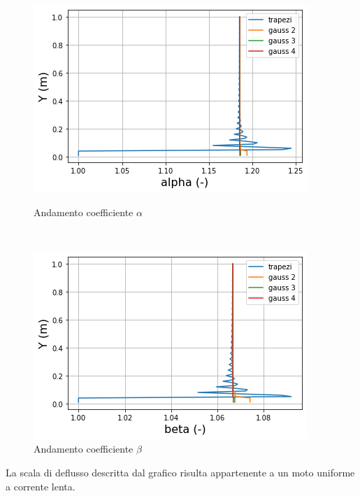 \documentclass[12pt]{article} %
\begin{document}
\begin{figure}[H]
\begin{minipage}[b]{8.5cm}
\centering
    \includegraphics[width=1 \textwidth]{alphatri.png}
    \caption{Andamento coefficiente $\alpha$}
    \label{fig:triangolare_alfa}
\end{minipage}
\ \hspace{2mm} \hspace{3mm} \
\begin{minipage}[b]{8.5cm}
    \centering
    \includegraphics[width=1 \textwidth]{betatri.png}
    \caption{Andamento coefficiente $\beta$}
    \label{fig:triangolare_beta}
\end{minipage}
\end{figure}

\newpage

\noindent La scala di deflusso descritta dal grafico risulta appartenente a un moto uniforme a corrente lenta. 
\end{document}
